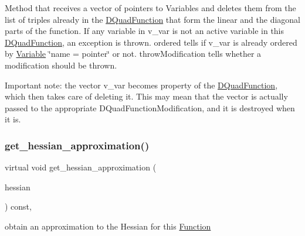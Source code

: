 Method that receives a vector of pointers to Variables and deletes them from the list of triples already in the \mbox{\hyperlink{class_s_m_spp__di__unipi__it_1_1_d_quad_function}{D\+Quad\+Function}} that form the linear and the diagonal parts of the function. If any variable in v\+\_\+var is not an active variable in this \mbox{\hyperlink{class_s_m_spp__di__unipi__it_1_1_d_quad_function}{D\+Quad\+Function}}, an exception is thrown. ordered tells if v\+\_\+var is already ordered by \mbox{\hyperlink{class_s_m_spp__di__unipi__it_1_1_variable}{Variable}} \char`\"{}name = pointer\char`\"{} or not. throw\+Modification tells whether a modification should be thrown.

Important note\+: the vector v\+\_\+var becomes property of the \mbox{\hyperlink{class_s_m_spp__di__unipi__it_1_1_d_quad_function}{D\+Quad\+Function}}, which then takes care of deleting it. This may mean that the vector is actually passed to the appropriate D\+Quad\+Function\+Modification, and it is destroyed when it is. \mbox{\label{class_s_m_spp__di__unipi__it_1_1_d_quad_function_a15b274da02800dcbec12695a689b327f}} 
\subsubsection{\texorpdfstring{get\+\_\+hessian\+\_\+approximation()}{get\_hessian\_approximation()}\hspace{0.1cm}{\footnotesize\ttfamily [1/2]}}
{\footnotesize\ttfamily virtual void get\+\_\+hessian\+\_\+approximation (\begin{DoxyParamCaption}\item[{\mbox{\hyperlink{class_s_m_spp__di__unipi__it_1_1_c15_function_ae7dd5ecf6e8711dc10787bb8d80b355b}{Dense\+Hessian}} \&}]{hessian }\end{DoxyParamCaption}) const\hspace{0.3cm}{\ttfamily [override]}, {\ttfamily [virtual]}}



obtain an approximation to the Hessian for this \mbox{\hyperlink{class_s_m_spp__di__unipi__it_1_1_function}{Function}} 

